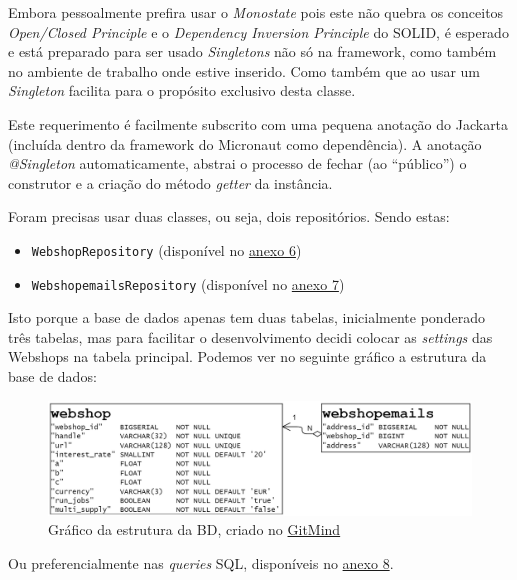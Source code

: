 Embora pessoalmente prefira usar o \textit{Monostate} pois este não quebra os conceitos \textit{Open/Closed Principle} e o \textit{Dependency Inversion Principle} do SOLID, é esperado e está preparado para ser usado \textit{Singletons} não só na framework, como também no ambiente de trabalho onde estive inserido. Como também que ao usar um \textit{Singleton} facilita para o propósito exclusivo desta classe.

Este requerimento é facilmente subscrito com uma pequena anotação do Jackarta (incluída dentro da framework do Micronaut como dependência). A anotação \textit{@Singleton} automaticamente, abstrai o processo de fechar (ao ``público'') o construtor e a criação do método \textit{getter} da instância.

Foram precisas usar duas classes, ou seja, dois repositórios. Sendo estas:

\begin{itemize}
  \item \texttt{WebshopRepository} (disponível no \hyperref[an6]{anexo 6})
  \item \texttt{WebshopemailsRepository} (disponível no \hyperref[an7]{anexo 7})
\end{itemize}

Isto porque a base de dados apenas tem duas tabelas, inicialmente ponderado três tabelas, mas para facilitar o desenvolvimento decidi colocar as \textit{settings} das Webshops na tabela principal. Podemos ver no seguinte gráfico a estrutura da base de dados:

\begin{figure}[!hbt]
  \centering
  \includegraphics[width=15cm]{figuras/db.png}
  \caption{Gráfico da estrutura da BD, criado no \href{https://gitmind.com/app/flowchart /51b11741757}{GitMind}}
  \label{fig:db}
\end{figure}
\FloatBarrier

Ou preferencialmente nas \textit{queries} SQL, disponíveis no \hyperref[an8]{anexo 8}.

\newpage